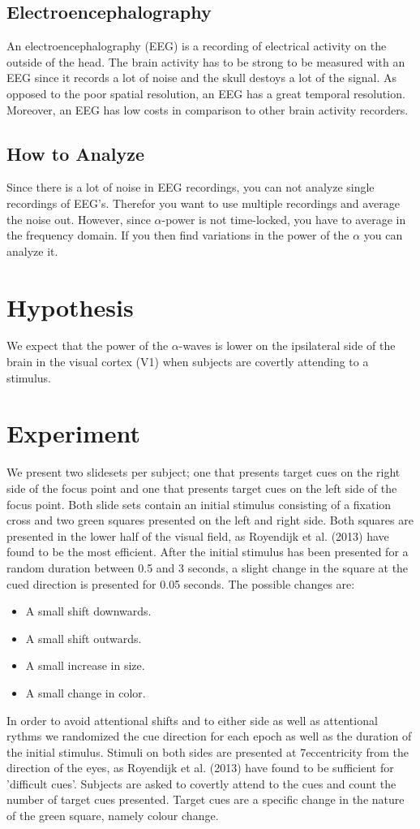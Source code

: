 \documentclass{article}
\begin{document}
\subsection{Electroencephalography}
An electroencephalography (EEG) is a recording of electrical activity on the
outside of the head. The brain activity has to be strong to be measured with an
EEG since it records a lot of noise and the skull destoys a lot of the signal.
As opposed to the poor spatial resolution, an EEG has a great temporal
resolution. Moreover, an EEG has low costs in comparison to other brain
activity recorders. 
\subsection{How to Analyze}
Since there is a lot of noise in EEG recordings, you can not analyze single
recordings of EEG's. Therefor you want to use multiple recordings and average
the noise out. However, since $\alpha$-power is not time-locked, you have to
average in the frequency domain. If you then find variations in the power of
the $\alpha$ you can analyze it.


\section{Hypothesis} 
We expect that the power of the $\alpha$-waves is lower on
the ipsilateral side of the brain in the visual cortex (V1) when subjects are
covertly attending to a stimulus.

\section{Experiment} 
We present two slidesets per subject; one that presents
target cues on the right side of the focus point and one that presents target
cues on the left side of the focus point. Both slide sets contain an initial
stimulus consisting of a fixation cross and two green squares presented on the
left and right side. Both squares are presented in the lower half of the visual
field, as Royendijk et al. (2013) have found to be the most efficient. After
the initial stimulus has been presented for a random duration between 0.5 and 3
seconds, a slight change in the square at the cued direction is presented for
0.05 seconds. 
The possible changes are: 
\begin{itemize} 
	\item A small shift downwards.  
	\item A small shift outwards.  
	\item A small increase in size.
  \item A small change in color.  
\end{itemize} In order to avoid attentional
	shifts and to either side as well as attentional rythms we randomized the cue
	direction for each epoch as well as the duration of the initial stimulus.
	Stimuli on both sides are presented at 7\degree eccentricity from the
	direction of the eyes, as Royendijk et al. (2013) have found to be sufficient
	for 'difficult cues'.  Subjects are asked to covertly attend to the cues and
	count the number of target cues presented. Target cues are a specific change
	in the nature of the green square, namely colour change. 
\end{document}
